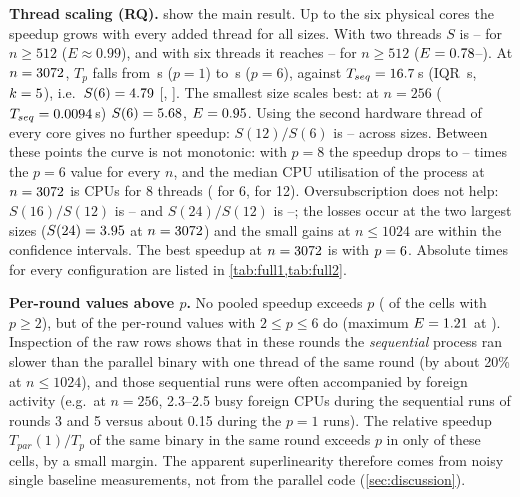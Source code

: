 \documentclass[conference,a4paper]{IEEEtran}
\begin{document}


\textbf{Thread scaling (RQ).}  show the main result. Up to the six physical
cores the speedup grows with every added thread for all sizes. With two threads $S$ is
\STwoNFiveTwelve--\STwoNThirtySeventyTwo{} for $n\ge512$ ($E\approx0.99$), and with six threads it reaches
\SSixNTwentyFortyEight--\SSixNTenTwentyFour{} for $n\ge512$ ($E=0.78$--\ESixNTenTwentyFour).
At $n=3072$, $T_p$ falls from \TLargeOne\,s ($p=1$) to \TLargeSix\,s ($p=6$), against $T_{seq}=16.7$\,s
(IQR \TseqLargeIqr\,s, $k=5$), i.e.\ $S(6)=4.79$ [\SLargeLoSix, \SLargeHiSix]. The smallest size
scales best: at $n=256$ ($T_{seq}=0.0094$\,s) $S(6)=5.68$, $E=0.95$.
Using the second hardware thread of every core gives no further speedup: $S(12)/S(6)$ is
\SmtGainMin--\SmtGainMax{} across sizes. Between these points the curve is not monotonic: with $p=8$ the
speedup drops to \EightDipMin--\EightDipMax{} times the $p=6$ value for every $n$, and the median CPU
utilisation of the process at $n=3072$ is \CpuUtilEight{} CPUs for 8 threads (\CpuUtilSix{} for 6,
\CpuUtilTwelve{} for 12). Oversubscription does not help: $S(16)/S(12)$ is
\OversubSixteenMin--\OversubSixteenMax{} and $S(24)/S(12)$ is \OversubMin--\OversubMax; the losses occur at the
two largest sizes ($S(24)=3.95$ at $n=3072$) and the small gains at $n\le1024$ are
within the confidence intervals. The best speedup at $n=3072$ is \SBestLarge{} with $p=6$. Absolute times for every configuration are listed in
\cref{tab:full1,tab:full2}.

\textbf{Per-round values above $p$.} No pooled speedup exceeds $p$ (\NumSuperlinearPooled{} of the cells with
$p\ge2$), but \NumSuperlinearRounds{} of the \NumRoundCells{} per-round values with $2\le p\le6$ do (maximum
$E=1.21$ at \MaxRoundEffCell). Inspection of the raw rows shows that in these rounds the
\emph{sequential} process ran slower than the parallel binary with one thread of the same round (by about 20\% at
$n\le1024$), and those sequential runs were often accompanied by foreign activity (e.g.\ at $n=256$, 2.3--2.5
busy foreign CPUs during the sequential runs of rounds 3 and 5 versus about 0.15 during the $p=1$ runs). The
relative speedup $T_{par}(1)/T_p$ of the same binary in the same round exceeds $p$ in only \NumSuperlinearRel{}
of these \NumSuperlinearRounds{} cells, by a small margin. The apparent superlinearity therefore comes from
noisy single baseline measurements, not from the parallel code (\cref{sec:discussion}).
\end{document}
